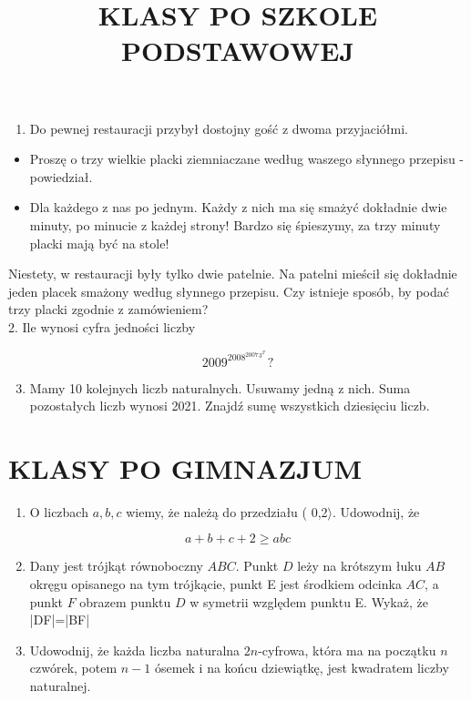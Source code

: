 \documentclass[10pt]{article}
\title{KLASY PO SZKOLE PODSTAWOWEJ }
\author{}
\date{}
\begin{document}
\maketitle
\begin{enumerate}
  \item Do pewnej restauracji przybył dostojny gość z dwoma przyjaciółmi.
\end{enumerate}

\begin{itemize}
  \item Proszę o trzy wielkie placki ziemniaczane według waszego słynnego przepisu - powiedział.
  \item Dla każdego z nas po jednym. Każdy z nich ma się smażyć dokładnie dwie minuty, po minucie z każdej strony! Bardzo się śpieszymy, za trzy minuty placki mają być na stole!
\end{itemize}

Niestety, w restauracji były tylko dwie patelnie. Na patelni mieścił się dokładnie jeden placek smażony według słynnego przepisu. Czy istnieje sposób, by podać trzy placki zgodnie z zamówieniem?\\
2. Ile wynosi cyfra jedności liczby

\[
2009^{2008^{2007}{ }^{3^{2^{1}}}} ?
\]

\begin{enumerate}
  \setcounter{enumi}{2}
  \item Mamy 10 kolejnych liczb naturalnych. Usuwamy jedną z nich. Suma pozostałych liczb wynosi 2021. Znajdź sumę wszystkich dziesięciu liczb.
\end{enumerate}

\section*{KLASY PO GIMNAZJUM}
\begin{enumerate}
  \item O liczbach \(a, b, c\) wiemy, że należą do przedziału ( 0,2\(\rangle\). Udowodnij, że
\end{enumerate}

\[
a+b+c+2 \geq a b c
\]

\begin{enumerate}
  \setcounter{enumi}{1}
  \item Dany jest trójkąt równoboczny \(A B C\). Punkt \(D\) leży na krótszym łuku \(A B\) okręgu opisanego na tym trójkącie, punkt E jest środkiem odcinka \(A C\), a punkt \(F\) obrazem punktu \(D\) w symetrii względem punktu E. Wykaż, że |DF|=|BF|
  \item Udowodnij, że każda liczba naturalna \(2 n\)-cyfrowa, która ma na początku \(n\) czwórek, potem \(n-1\) ósemek i na końcu dziewiątkę, jest kwadratem liczby naturalnej.
\end{enumerate}
\end{document}
